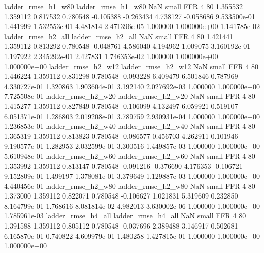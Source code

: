       ladder_rmse_h1_w80       ladder_rmse_h1_w80                   NaN      small      FFR                 4 80 1.355532       1.359112 0.817532       0.780548   -0.105388     -0.263434      4.738127    -0.058686   9.533500e-01  1.441999 1.532553e-01     4.481814   2.471396e-05            1.000000    1.000000e+00        1.141785e-02
      ladder_rmse_h2_all       ladder_rmse_h2_all                   NaN      small      FFR                 4 80 1.421441       1.359112 0.813292       0.780548   -0.048761      4.586040      4.194962     1.009075   3.160192e-01  1.197922 2.345292e-01     2.427831   1.746353e-02            1.000000    1.000000e+00        1.000000e+00
      ladder_rmse_h2_w12       ladder_rmse_h2_w12                   NaN      small      FFR                 4 80 1.446224       1.359112 0.831298       0.780548   -0.093228      6.409479      6.501846     0.787969   4.330727e-01  1.320863 1.903604e-01     3.192140   2.027692e-03            1.000000    1.000000e+00        7.725508e-01
      ladder_rmse_h2_w20       ladder_rmse_h2_w20                   NaN      small      FFR                 4 80 1.415277       1.359112 0.827849       0.780548   -0.106099      4.132497      6.059921     0.519107   6.051371e-01  1.286803 2.019208e-01     3.789759   2.930931e-04            1.000000    1.000000e+00        1.236853e-01
      ladder_rmse_h2_w40       ladder_rmse_h2_w40                   NaN      small      FFR                 4 80 1.365319       1.359112 0.813823       0.780548   -0.086577      0.456703      4.262911     0.101946   9.190577e-01  1.282953 2.032599e-01     3.300516   1.449857e-03            1.000000    1.000000e+00        5.610948e-01
      ladder_rmse_h2_w60       ladder_rmse_h2_w60                   NaN      small      FFR                 4 80 1.353992       1.359112 0.813147       0.780548   -0.091216     -0.376690      4.176353    -0.106721   9.152809e-01  1.499197 1.378081e-01     3.379649   1.129887e-03            1.000000    1.000000e+00        4.440456e-01
      ladder_rmse_h2_w80       ladder_rmse_h2_w80                   NaN      small      FFR                 4 80 1.373000       1.359112 0.822071       0.780548   -0.106627      1.021831      5.319609     0.232850   8.164799e-01  1.768616 8.081814e-02     4.982013   3.630002e-06            1.000000    1.000000e+00        1.785961e-03
      ladder_rmse_h4_all       ladder_rmse_h4_all                   NaN      small      FFR                 4 80 1.391588       1.359112 0.805112       0.780548   -0.037696      2.389488      3.146917     0.502681   6.165870e-01  0.740822 4.609979e-01     1.480258   1.427815e-01            1.000000    1.000000e+00        1.000000e+00
